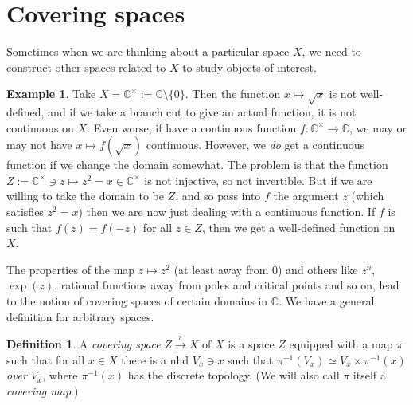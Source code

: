 \documentclass{tufte-handout}
\def\RR{\mathbb{R}}
\def\CC{\mathbb{C}}
\DeclareMathOperator{\pr}{pr}
\theoremstyle{definition}
\newtheorem{definition}{Definition}
\newtheorem{example}{Example}
\begin{document}
\section{Covering spaces}

Sometimes when we are thinking about a particular space $X$, we need to construct other spaces 
related to $X$ to study objects of interest.

\begin{example}
Take $X = \CC^\times :=\CC \setminus \{0\}$. Then the function $x\mapsto\sqrt{x}$ is
not well-defined, and if we take a branch cut to give an actual function, it is not continuous on $X$.
Even worse, if have a continuous function $f\colon \CC^\times \to \CC$, we may or may not have $x\mapsto f(\sqrt{x})$ continuous.
However, we \emph{do} get a continuous function if we change the domain somewhat. 
The problem is that the function $Z :=\CC^\times \ni z\mapsto z^2 = x \in \CC^\times$ is not injective, so not invertible.
But if we are willing to take the domain to be $Z$, and so pass into $f$ the argument $z$ (which satisfies $z^2 = x$)
then we are now just dealing with a continuous function.
If $f$ is such that $f(z) = f(-z)$ for all $z\in Z$, then we get a well-defined function on $X$.
\end{example}

The properties of the map $z\mapsto z^2$ (at least away from $0$) and others like $z^n$, $\exp(z)$, rational functions away from poles and critical points and so on, lead to the notion of 
covering spaces of certain domains in $\CC$. We have a general definition for arbitrary spaces.



\begin{definition}
A\marginnote{%
\[
\xymatrix{\pi^{-1}(V_x) \ar[r]^-\simeq \ar[d]_{\pi} & V_x \times \pi^{-1}(x)\ar[dl]^{\pr_1}\\V_x}
\]
}
\emph{covering space} $Z\xrightarrow{\pi} X$ of $X$ is a space $Z$ equipped with a map 
$\pi$ such that for all $x\in X$ there is a nhd $V_x \ni x$ such that $\pi^{-1}(V_x) 
\simeq V_x \times \pi^{-1}(x)$ \emph{over} $V_x$, where 
$\pi^{-1}(x)$ has the discrete topology.
(We will also call $\pi$ itself a 
\emph{covering map}.)
\end{definition}
\end{document}
